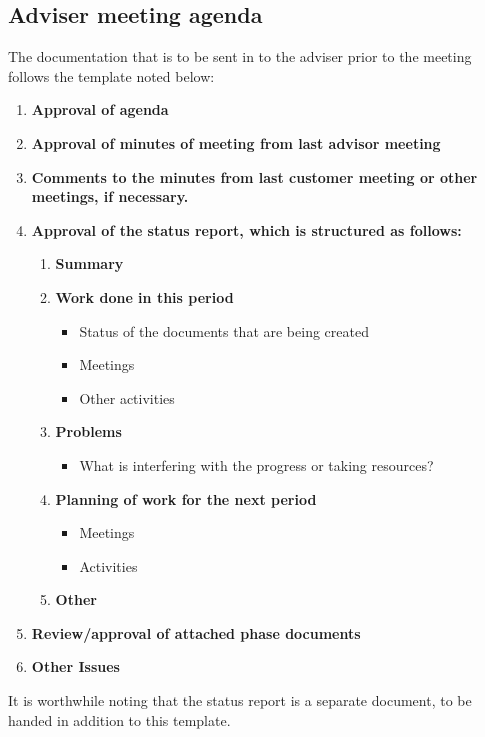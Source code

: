 \documentclass[../document]{subfiles}
\begin{document}
\subsection{Adviser meeting agenda}
\label{adviser_meeting_agenda}
The documentation that is to be sent in to the adviser prior to the meeting follows the template noted below:

\begin{enumerate}
	\item
	\textbf{Approval of agenda}
	\item
	\textbf{Approval of minutes of meeting from last advisor meeting}
	\item
	\textbf{Comments to the minutes from last customer meeting or other meetings, if necessary.}
	\item
	\textbf{Approval of the status report, which is structured as follows:}
	\begin{enumerate}[label*=\arabic*.]
		\item
		\textbf{Summary}
		\item
		\textbf{Work done in this period}
		\begin{itemize}
			\item
			Status of the documents that are being created
			\item
			Meetings
			\item
			Other activities
		\end{itemize}
		\item
		\textbf{Problems}
		\begin{itemize}
			\item
			What is interfering with the progress or taking resources?
		\end{itemize}
		\item
		\textbf{Planning of work for the next period}
		\begin{itemize}
			\item
			Meetings
			\item
			Activities
		\end{itemize}
		\item
		\textbf{Other}
	\end{enumerate}
	\item
	\textbf{Review/approval of attached phase documents}
	\item
	\textbf{Other Issues}
\end{enumerate}

It is worthwhile noting that the status report is a separate document, to be handed in addition to this template.
\end{document}
